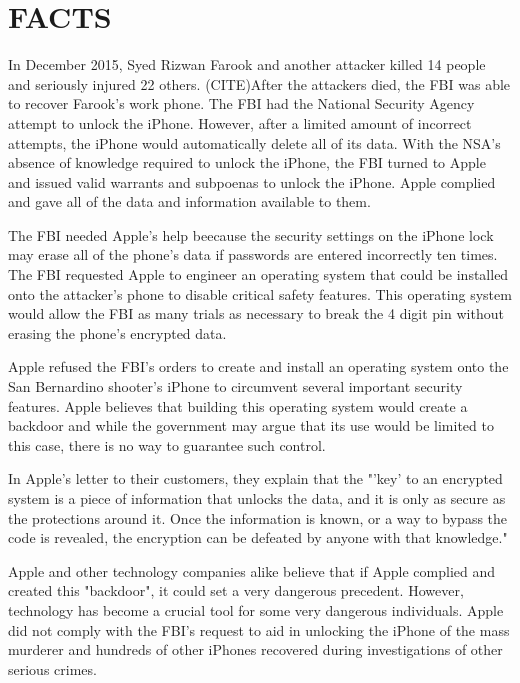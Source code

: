 
\section{FACTS}
In December 2015, Syed Rizwan Farook and another attacker killed 14 people and seriously injured 22 others. (CITE)After the attackers died, the FBI was able to recover Farook's work phone. The FBI had the National Security Agency attempt to unlock the iPhone. However, after a limited amount of incorrect attempts, the iPhone would automatically delete all of its data. With the NSA's absence of knowledge required to unlock the iPhone, the FBI turned to Apple and issued valid warrants and subpoenas to unlock the iPhone. Apple complied and gave all of the data and information available to them.\cite{apple-letter}\par

The FBI needed Apple's help beecause the security settings on the iPhone lock may erase all of the phone's data if passwords are entered incorrectly ten times. The FBI requested Apple to engineer an operating system that could be installed onto the attacker's phone to disable critical safety features. This operating system would allow the FBI as many trials as necessary to break the 4 digit pin without erasing the phone's encrypted data. \cite{aljazeera}\par

Apple refused the FBI's orders to create and install an operating system onto the San Bernardino shooter's iPhone to circumvent several important security features. Apple believes that building this operating system would create a backdoor and while the government may argue that its use would be limited to this case, there is no way to guarantee such control. \cite{apple-letter}\par

In Apple's letter to their customers, they explain that the "'key' to an encrypted system is a piece of information that unlocks the data, and it is only as secure as the protections around it. Once the information is known, or a way to bypass the code is revealed, the encryption can be defeated by anyone with that knowledge." \cite{apple-letter}\par
 
Apple and other technology companies alike believe that if Apple complied and created this "backdoor", it could set a very dangerous precedent. However, technology has become a crucial tool for some very dangerous individuals.
Apple did not comply with the FBI's request to aid in unlocking the iPhone of the mass murderer and hundreds of other iPhones recovered during investigations of other serious crimes.
\vspace{0.4cm}





